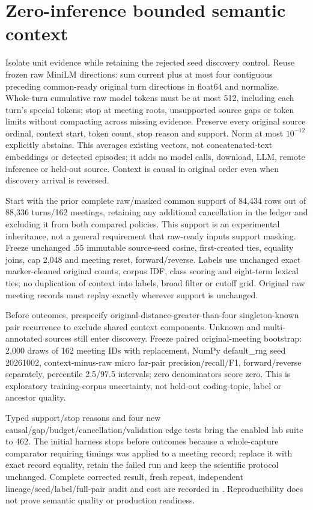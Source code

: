 \documentclass[11pt]{article}
\begin{document}
\section{Zero-inference bounded semantic context}
Isolate unit evidence while retaining the rejected seed discovery control.
Reuse frozen raw MiniLM directions: sum current plus at most four contiguous
preceding common-ready original turn directions in float64 and normalize.
Whole-turn cumulative raw model tokens must be at most 512, including each
turn's special tokens; stop at meeting roots, unsupported source gaps or token
limits without compacting across missing evidence. Preserve every original
source ordinal, context start, token count, stop reason and support. Norm at
most $10^{-12}$ explicitly abstains. This averages existing vectors, not
concatenated-text embeddings or detected episodes; it adds no model calls,
download, LLM, remote inference or held-out source. Context is causal in original
order even when discovery arrival is reversed.

Start with the prior complete raw/masked common support of 84,434 rows out of
88,336 turns/162 meetings, retaining any additional cancellation in the ledger
and excluding it from both compared policies. This support is an experimental
inheritance, not a general requirement that raw-ready inputs support masking.
Freeze unchanged .55 immutable source-seed cosine, first-created ties, equality
joins, cap 2,048 and meeting reset, forward/reverse. Labels use unchanged exact
marker-cleaned original counts, corpus IDF, class scoring and eight-term lexical
ties; no duplication of context into labels, broad filter or cutoff grid.
Original raw meeting records must replay exactly wherever support is unchanged.

Before outcomes, prespecify original-distance-greater-than-four singleton-known
pair recurrence to exclude shared context components. Unknown and multi-annotated
sources still enter discovery. Freeze paired original-meeting bootstrap: 2,000
draws of 162 meeting IDs with replacement, NumPy default\_rng seed 20261002,
context-minus-raw micro far-pair precision/recall/F1, forward/reverse separately,
percentile 2.5/97.5 intervals; zero denominators score zero. This is exploratory
training-corpus uncertainty, not held-out coding-topic, label or ancestor quality.

Typed support/stop reasons and four new causal/gap/budget/cancellation/validation
edge tests bring the enabled lab suite to 462. The initial harness stops before
outcomes because a whole-capture comparator requiring timings was applied to a
meeting record; replace it with exact record equality, retain the failed run and
keep the scientific protocol unchanged. Complete corrected result, fresh repeat,
independent lineage/seed/label/full-pair audit and cost are recorded in
. Reproducibility does not
prove semantic quality or production readiness.
\end{document}
